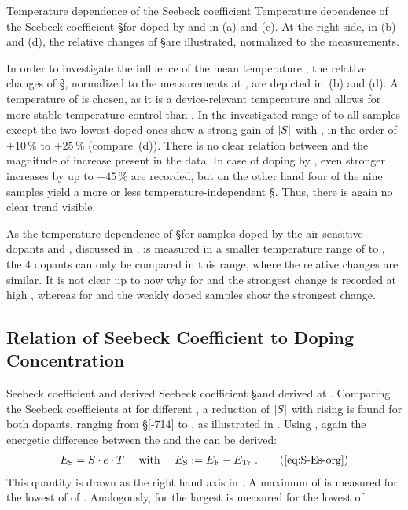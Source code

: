 %
{Temperature dependence of the Seebeck coefficient}%
{Temperature dependence of the Seebeck coefficient \S for \CS doped by \aob and \dmbi in (a) and (c). At the right side, in (b) and (d), the relative changes of \S are illustrated, normalized to the \Tm[40] measurements.
}

In order to investigate the influence of the mean temperature \Tm, the relative changes of \S, normalized to the measurements at \Tm[40], are depicted in \,(b) and (d). A temperature of  is chosen, as it is a device-relevant temperature and allows for more stable temperature control than \Tm[30]. In the investigated range of \Tm[30] to  all \dmbi samples except the two lowest doped ones show a strong gain of $|\S|$ with \T, in the order of $+10\,\%$ to $+25\,\%$ (compare \,(d)). There is no clear relation between \CLong and the magnitude of increase present in the data.
In case of doping by \aob, even stronger increases by up to $+45\,\%$ are recorded, but on the other hand four of the nine samples yield a more or less temperature-independent \S. Thus, there is again no clear trend visible.

As the temperature dependence of \S for samples doped by the air-sensitive dopants \CrPd and \WPd, discussed in , is measured in a smaller temperature range of \Tm[30] to , the 4 dopants can only be compared in this range, where the relative changes are similar.
It is not clear up to now why for \aob and \dmbi the strongest change is recorded at high \CLongs, whereas for \CrPd and \WPd the weakly doped samples show the strongest change.

\subsection{Relation of Seebeck Coefficient to Doping Concentration}
%
%
{Seebeck coefficient and derived \EsLong}
{Seebeck coefficient \S and derived \EsLongL at \Tm[40].}
%
Comparing the Seebeck coefficients at \Tm[40] for different \CLongs, a reduction of $|\S|$ with rising \C is found for both dopants, ranging from \S[-714] to , as illustrated in .
Using , again the energetic difference \Es between the \EfLong \Ef and the \EtLong \Et can be derived:
\begin{align}
 \Es =\S \cdot e \cdot \T \quad \text{ with } \quad\Es := \Ef - \Et
\PUNKT
\tag{\ref{eq:S-Es-org}}
\end{align}
This quantity is drawn as the right hand axis in .
A maximum of \Es[-183] is measured for the lowest \CLong of \C[0.0067] of \aob. Analogously, for \dmbi the largest \Es[-147] is measured for the lowest \CLong of \C[0.013].


